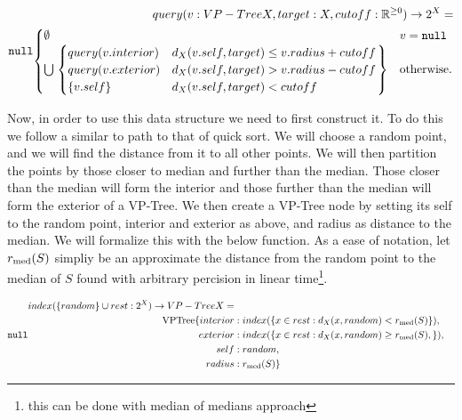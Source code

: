 \begin{align*}
query(v : VP-Tree X, target : X, cutoff : \Rnn) \to 2^X = \\ \begin{cases}
    \emptyset & v = \null \\ 
    \bigcup \left.\begin{cases}
        query(v.interior) & d_X(v.self, target) \le v.radius + cutoff \\ 
        query(v.exterior) & d_X(v.self, target) > v.radius - cutoff \\ 
        \{v.self\} & d_X(v.self, target) < cutoff
    \end{cases}\right\} & \otw 
\end{cases}
\end{align*}

Now, in order to use this data structure we need to first construct it.
To do this we follow a similar to path to that of quick sort.
We will choose a random point, and we will find the distance from it to all other points.
We will then partition the points by those closer to median and further than the median.
Those closer than the median will form the interior and those further than the median will form the exterior of a VP-Tree.
We then create a VP-Tree node by setting its self to the random point, interior and exterior as above, 
and radius as distance to the median. 
We will formalize this with the below function.
As a ease of notation, let $r_{\text{med}}(S)$ simpliy be an approximate the distance from the random point to the 
median of $S$ found with arbitrary percision in linear time\footnote{this can be done with median of medians approach}.

\begin{align*}
index(\{random\} \cup rest: 2^X) \to VP-Tree X = \\ 
\text{VPTree}\{interior&:index(\{x \in rest : d_X(x, random) < \mradius{S}\}), \\
exterior&:index(\{x \in rest : d_X(x, random) \ge \mradius{S}, \}),\\ 
self&:random,\\
radius&:\mradius{S}\}
\end{align*}